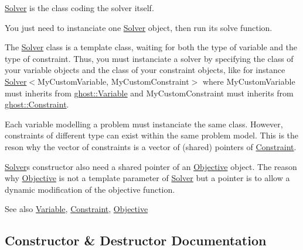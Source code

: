 \hyperlink{classghost_1_1Solver}{Solver} is the class coding the solver itself. 

You just need to instanciate one \hyperlink{classghost_1_1Solver}{Solver} object, then run its \textquotesingle{}solve\textquotesingle{} function.

The \hyperlink{classghost_1_1Solver}{Solver} class is a template class, waiting for both the type of variable and the type of constraint. Thus, you must instanciate a solver by specifying the class of your variable objects and the class of your constraint objects, like for instance \hyperlink{classghost_1_1Solver}{Solver}$<$My\+Custom\+Variable, My\+Custom\+Constraint$>$ where My\+Custom\+Variable must inherits from \hyperlink{classghost_1_1Variable}{ghost\+::\+Variable} and My\+Custom\+Constraint must inherits from \hyperlink{classghost_1_1Constraint}{ghost\+::\+Constraint}.

Each variable modelling a problem must instanciate the same class. However, constraints of different type can exist within the same problem model. This is the reson why the vector of constraints is a vector of (shared) pointers of \hyperlink{classghost_1_1Constraint}{Constraint}.

\hyperlink{classghost_1_1Solver}{Solver}\textquotesingle{}s constructor also need a shared pointer of an \hyperlink{classghost_1_1Objective}{Objective} object. The reason why \hyperlink{classghost_1_1Objective}{Objective} is not a template parameter of \hyperlink{classghost_1_1Solver}{Solver} but a pointer is to allow a dynamic modification of the objective function.

\begin{DoxySeeAlso}{See also}
\hyperlink{classghost_1_1Variable}{Variable}, \hyperlink{classghost_1_1Constraint}{Constraint}, \hyperlink{classghost_1_1Objective}{Objective} 
\end{DoxySeeAlso}


\subsection{Constructor \& Destructor Documentation}
